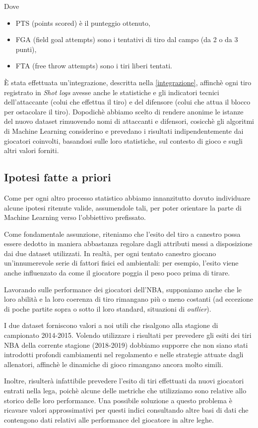 Dove
\begin{itemize}
\item PTS (points scored) è il punteggio ottenuto,
\item FGA (field goal attempts) sono i tentativi di tiro dal campo (da 2 o da 3 punti),
\item FTA (free throw attempts) sono i tiri liberi tentati.
\end{itemize}

È stata effettuata un’integrazione, descritta nella \autoref{integrazione},  affinchè ogni tiro registrato in \textit{Shot logs} avesse anche le statistiche e gli indicatori tecnici dell’attaccante (colui che effettua il tiro) e del difensore (colui che attua il blocco per ostacolare il tiro). Dopodichè abbiamo scelto di rendere anonime le istanze del nuovo dataset rimuovendo nomi di attaccanti e difensori, cosicchè gli algoritmi di Machine Learning considerino e prevedano i risultati indipendentemente dai giocatori coinvolti, basandosi sulle loro statistiche, sul contesto di gioco e sugli altri valori forniti.

\subsection{Ipotesi fatte a priori}

Come per ogni altro processo statistico abbiamo innanzitutto dovuto individuare alcune ipotesi ritenute valide, assumendole tali, per poter orientare la parte di Machine Learning verso l’obbiettivo prefissato.
\par
Come fondamentale assunzione, riteniamo che l’esito del tiro a canestro possa essere dedotto in maniera abbastanza regolare dagli attributi messi a disposizione dai due dataset utilizzati. In realtà, per ogni tentato canestro giocano un’innumerevole serie di fattori fisici ed ambientali: per esempio, l’esito viene anche influenzato da come il giocatore poggia il peso poco prima di tirare.
\par
Lavorando sulle performance dei giocatori dell’NBA, supponiamo anche che le loro abilità e la loro coerenza di tiro rimangano più o meno costanti (ad eccezione di poche partite sopra o sotto il loro standard, situazioni di \textit{outlier}).
\par
I due dataset forniscono valori a noi utili che risalgono alla stagione di campionato 2014-2015. Volendo utilizzare i risultati per prevedere gli esiti dei tiri NBA della corrente stagione (2018-2019) dobbiamo supporre che non siano stati introdotti profondi cambiamenti nel regolamento e nelle strategie attuate dagli allenatori, affinchè le dinamiche di gioco rimangano ancora molto simili.
\par
Inoltre, risulterà infattibile prevedere l’esito di tiri effettuati da nuovi giocatori entrati nella lega, poichè alcune delle metriche che utilizziamo sono relative allo storico delle loro performance. 
Una possibile soluzione a questo problema è ricavare valori approssimativi per questi indici consultando altre basi di dati che contengono dati relativi alle performance del giocatore in altre leghe.

